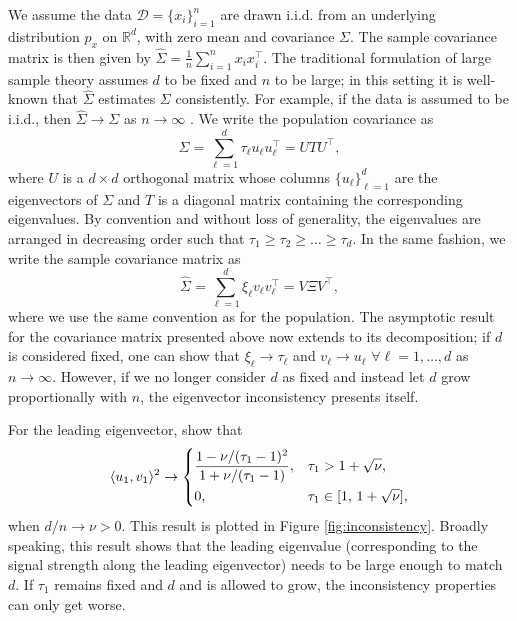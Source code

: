\documentclass{article}
\begin{document}
We assume the data  $\mathcal{D} = \{x_i\}_{i=1}^n$ are drawn i.i.d. from an underlying distribution $p_{x}$ on $\mathbb{R}^d$, with zero mean and covariance $\Sigma$. The sample covariance matrix is then given by $\widehat{\Sigma} = \frac{1}{n} \sum_{i=1}^n x_i x_i^\top$. The traditional formulation of large sample theory assumes $d$ to be fixed and $n$ to be large; in this setting it is well-known that $\widehat{\Sigma}$ estimates $\Sigma$ consistently. For example, if the data is assumed to be i.i.d., then $\widehat{\Sigma} \to \Sigma$ as $n \to \infty$ \citep{wainwright_high-dimensional_2019}. We write the population covariance as 
\begin{equation*}
    \Sigma = \sum_{\ell=1}^d \tau_{\ell} u_{\ell} u_{\ell}^\top = UTU^\top,
\end{equation*}
where $U$ is a $d \times d$ orthogonal matrix whose columns $\{u_{\ell}\}_{\ell=1}^d$ are the eigenvectors of $\Sigma$ and $T$ is a diagonal matrix containing the corresponding eigenvalues. By convention and without loss of generality, the eigenvalues are arranged in decreasing order such that \mbox{$\tau_1 \geq \tau_2 \geq \ldots \geq \tau_d$}. In the same fashion, we write the sample covariance matrix as
\begin{equation*}
    \widehat{\Sigma} = \sum_{\ell=1}^d \xi_{\ell} v_{\ell} v_{\ell}^\top = V \Xi V^\top,
\end{equation*}
where we use the same convention as for the population. The asymptotic result for the covariance matrix presented above now extends to its decomposition; if $d$ is considered fixed, one can show that $\xi_{\ell} \to \tau_{\ell}$ and $v_{\ell} \to u_{\ell}$ $\forall\ell=1,\dots,d$ as $n \to \infty$. However, if we no longer consider $d$ as fixed and instead let $d$ grow proportionally with $n$, the eigenvector inconsistency presents itself. 

For the leading eigenvector, \citet{johnstone_pca_2018} show that
\begin{equation}\label{eq:inconcistency}
\langle u_1, v_1\rangle ^2 \to
\begin{dcases}
\dfrac{1-\nu/(\tau_1 - 1)^2}{1+\nu/(\tau_1 - 1)}, &\tau_1 > 1 + \sqrt{\nu},\\
0,                                                   &\tau_1 \in [1,\, 1 + \sqrt{\nu}],
\end{dcases}
\end{equation}
when $d/n \to \nu > 0$. This result is plotted in Figure \ref{fig:inconsistency}. Broadly speaking, this result shows that the leading eigenvalue (corresponding to the signal strength along the leading eigenvector) needs to be large enough to match $d$. If $\tau_1$ remains fixed and $d$ and is allowed to grow, the inconsistency properties can only get worse.
\end{document}
